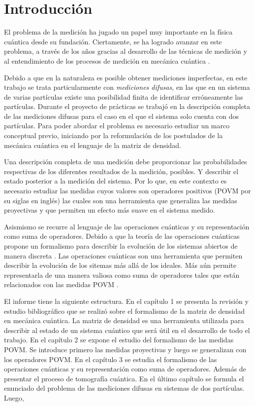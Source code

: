 \chapter*{Introducción}

El problema de la medición ha jugado un papel muy importante en la física cuántica desde su fundación. Ciertamente, se ha logrado avanzar en este problema, a través de los años gracias al desarrollo de las técnicas de medición y al entendimiento de los procesos de medición en mecánica cuántica {\cite{Pineda_2021}}. 

Debido a que en la naturaleza es posible obtener  mediciones imperfectas, en este trabajo se trata particularmente con \textit{mediciones difusas}, en las que en un sistema de varias partículas existe una posibilidad finita de identificar erróneamente las partículas. Durante el proyecto de prácticas se trabajó en la descripción completa de las mediciones difusas para el caso en el que el sistema solo cuenta con dos partículas. Para poder abordar el problema es necesario estudiar un marco conceptual previo, iniciando por la reformulación de los postulados de la mecánica cuántica en el lenguaje de la matriz de densidad.

Una descripción completa de una medición debe proporcionar las probabilidades respectivas de los diferentes resultados de la medición, posibles. Y describir el estado posterior a la medición del sistema. Por lo que, en este contexto es necesario estudiar las medidas cuyos valores son operadores positivos (POVM por su siglas en inglés) las cuales son una herramienta que generaliza las medidas proyectivas y que permiten un efecto más suave en el sistema medido.  

Asismismo se recurre al lenguaje de las operaciones cuánticas y su representación como  suma de operadores. Debido a que la teoría de las operaciones cuánticas propone un formalismo para describir la evolución de los sistemas abiertos de manera discreta {\cite{nielsen_chuang_2010}}. Las operaciones cuánticas son una herramienta que permiten describir la evolución de los sitemas más allá de los ideales. Más aún permite representarla de una manera valiosa como suma de operadores tales que están relacionados con las medidas POVM \@.

El informe tiene la siguiente estructura.  En el capítulo 1 se presenta la revisión y estudio bibliográfico que se realizó sobre el formalismo de la matriz de densidad en mecánica cuántica. La matriz de densidad es una herramienta utilizada para describir al estado de un sistema cuántico que será útil en el desarrollo de todo el trabajo. En el capítulo 2 se expone el estudio del formalismo de las medidas POVM\@. Se introduce primero las medidas proyectivas y luego se generalizan con los operadores POVM\@. En el capítulo 3 se estudia el formalismo de las operaciones cuánticas y su representación como suma de operadores. Además de presentar el proceso de tomografía cuántica. En el último capítulo se formula el enunciado del problema de las mediciones difusas en sistemas de dos partículas. Luego,